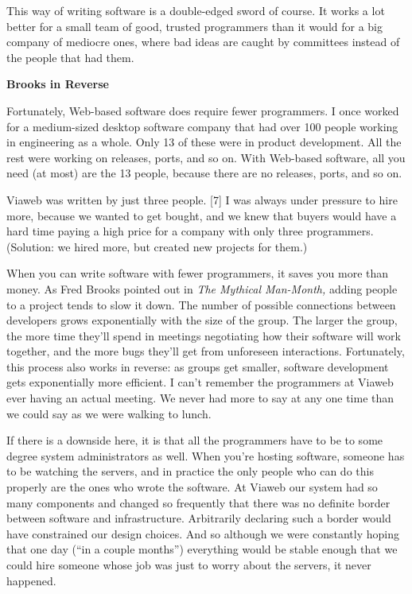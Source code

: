 This way of writing software is a double-edged sword of course. It works
a lot better for a small team of good, trusted programmers than it would
for a big company of mediocre ones, where bad ideas are caught by
committees instead of the people that had them.

\textbf{Brooks in Reverse}

Fortunately, Web-based software does require fewer programmers. I once
worked for a medium-sized desktop software company that had over 100
people working in engineering as a whole. Only 13 of these were in
product development. All the rest were working on releases, ports, and
so on. With Web-based software, all you need (at most) are the 13
people, because there are no releases, ports, and so on.

Viaweb was written by just three people. {[}7{]} I was always under
pressure to hire more, because we wanted to get bought, and we knew that
buyers would have a hard time paying a high price for a company with
only three programmers. (Solution: we hired more, but created new
projects for them.)

When you can write software with fewer programmers, it saves you more
than money. As Fred Brooks pointed out in \emph{The Mythical Man-Month,}
adding people to a project tends to slow it down. The number of possible
connections between developers grows exponentially with the size of the
group. The larger the group, the more time they'll spend in meetings
negotiating how their software will work together, and the more bugs
they'll get from unforeseen interactions. Fortunately, this process also
works in reverse: as groups get smaller, software development gets
exponentially more efficient. I can't remember the programmers at Viaweb
ever having an actual meeting. We never had more to say at any one time
than we could say as we were walking to lunch.

If there is a downside here, it is that all the programmers have to be
to some degree system administrators as well. When you're hosting
software, someone has to be watching the servers, and in practice the
only people who can do this properly are the ones who wrote the
software. At Viaweb our system had so many components and changed so
frequently that there was no definite border between software and
infrastructure. Arbitrarily declaring such a border would have
constrained our design choices. And so although we were constantly
hoping that one day (``in a couple months'') everything would be stable
enough that we could hire someone whose job was just to worry about the
servers, it never happened.

